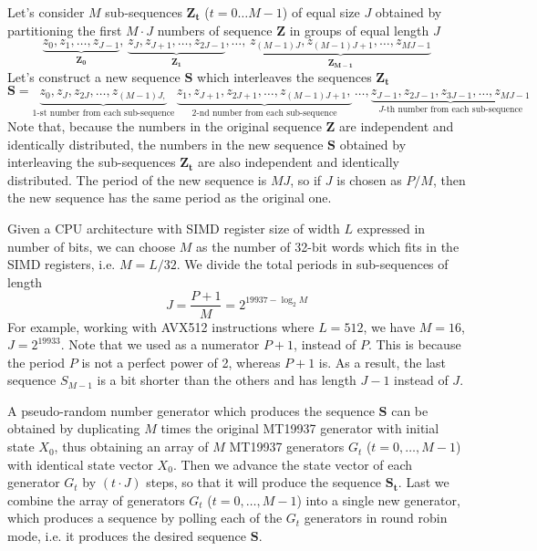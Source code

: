 \documentclass[preprint,1p,times]{elsarticle}
\begin{document}
\noindent Let's consider $M$ sub-sequences $\boldsymbol{Z_t}$ ($t=0\dots M-1$) of equal size $J$ obtained by partitioning the first $M\cdot J$ numbers of sequence $\boldsymbol{Z}$ in groups of equal length $J$
\begin{equation}
\label{eq:subseq}
   \underbrace{z_0, z_1, \dots, z_{J-1}}_{\boldsymbol{Z_0}},\, \underbrace{z_J, z_{J+1}, \dots, z_{2J-1}}_{\boldsymbol{Z_1}}, \dots,\, \underbrace{z_{(M-1)J}, z_{(M-1)J+1}, \dots, z_{MJ-1}}_{\boldsymbol{Z_{M-1}}}
\end{equation}
Let's construct a new sequence $\boldsymbol{S}$ which interleaves the sequences $\boldsymbol{Z_t}$
\begin{equation}
\label{eq:combseq}
   \boldsymbol{S}=\underbrace{z_0, z_J, z_{2J}, \dots, z_{(M-1)J,}}_{\text{1-st number from each sub-sequence}} \,\underbrace{z_1, z_{J+1}, z_{2J+1}, \dots, z_{(M-1)J+1},}_{\text{2-nd number from each sub-sequence}}\, \dots, \underbrace{z_{J-1}, z_{2J-1}, z_{3J-1}, \dots, z_{MJ-1}}_{\text{$J$-th number from each sub-sequence}}
\end{equation}
Note that, because the numbers in the original sequence $\boldsymbol{Z}$ are independent and identically distributed, the numbers in the new sequence $\boldsymbol{S}$ obtained by interleaving the sub-sequences $\boldsymbol{Z_t}$ are also independent and identically distributed. The period of the new sequence is $MJ$, so if $J$ is chosen as $P/M$, then the new sequence has the same period as the original one.

\noindent Given a CPU architecture with SIMD register size of width $L$ expressed in number of bits, we can choose $M$ as the number of 32-bit words which fits in the SIMD registers, i.e. $M=L/32$. We divide the total periods in sub-sequences of length $$J=\frac{P+1}{M}=2^{19937-\log_2M}$$
For example, working with AVX512 instructions where $L=512$, we have $M=16$, $J=2^{19933}$. Note that we used as a numerator $P+1$, instead of $P$. This is because the period $P$ is not a perfect power of 2, whereas $P+1$ is. As a result, the last sequence $S_{M-1}$ is a bit shorter than the others and has length $J-1$ instead of $J$.

\noindent A pseudo-random number generator which produces the sequence $\boldsymbol{S}$ can be obtained by duplicating $M$ times the original MT19937 generator with initial state $X_0$, thus obtaining an array of $M$ MT19937 generators $G_t$ ($t=0,\dots, M-1$) with identical state vector $X_0$. Then we advance the state vector of each generator $G_t$ by $(t\cdot J)$ steps, so that it will produce the sequence $\boldsymbol{S_t}$. Last we combine the array of generators $G_t$ ($t=0,\dots, M-1$) into a single new generator, which produces a sequence by polling each of the $G_t$ generators in round robin mode, i.e. it produces the desired sequence $\boldsymbol{S}$.
\end{document}
